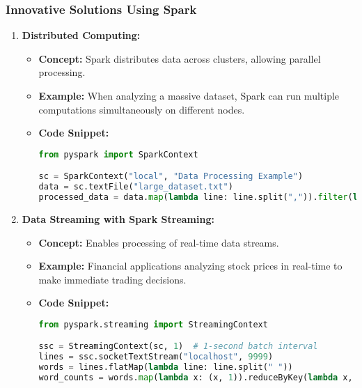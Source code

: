 \documentclass[aspectratio=169]{beamer}
\begin{document}
\begin{frame}[fragile]
    \frametitle{Innovative Solutions Using Spark}
    \begin{enumerate}
        \item \textbf{Distributed Computing:}
        \begin{itemize}
            \item \textbf{Concept:} Spark distributes data across clusters, allowing parallel processing.
            \item \textbf{Example:} When analyzing a massive dataset, Spark can run multiple computations simultaneously on different nodes.
            \item \textbf{Code Snippet:}
            \begin{lstlisting}[language=python]
from pyspark import SparkContext

sc = SparkContext("local", "Data Processing Example")
data = sc.textFile("large_dataset.txt")
processed_data = data.map(lambda line: line.split(",")).filter(lambda x: x[1] != '')
            \end{lstlisting}
        \end{itemize}

        \item \textbf{Data Streaming with Spark Streaming:}
        \begin{itemize}
            \item \textbf{Concept:} Enables processing of real-time data streams.
            \item \textbf{Example:} Financial applications analyzing stock prices in real-time to make immediate trading decisions.
            \item \textbf{Code Snippet:}
            \begin{lstlisting}[language=python]
from pyspark.streaming import StreamingContext

ssc = StreamingContext(sc, 1)  # 1-second batch interval
lines = ssc.socketTextStream("localhost", 9999)
words = lines.flatMap(lambda line: line.split(" "))
word_counts = words.map(lambda x: (x, 1)).reduceByKey(lambda x, y: x + y)
            \end{lstlisting}
        \end{itemize}

    \end{enumerate}
\end{frame}
\end{document}
